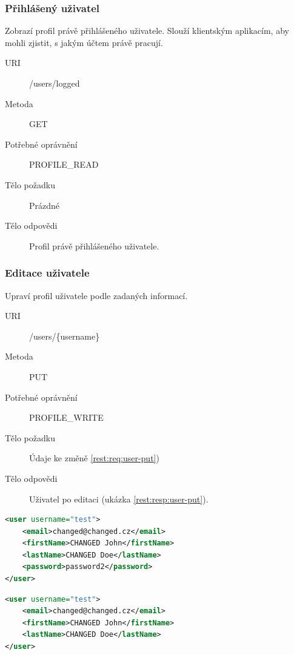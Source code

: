 \documentclass[thesis=M,czech]{FITthesis}[2014/05/6]
\begin{document}
\subsubsection{Přihlášený uživatel}
Zobrazí profil právě přihlášeného uživatele. Slouží klientským aplikacím, aby mohli zjistit, s jakým účtem právě pracují.
\begin{description}
  \item[URI] /users/logged
  \item[Metoda] GET
  \item[Potřebné oprávnění] PROFILE\_READ
  \item[Tělo požadku] Prázdné
  \item[Tělo odpovědi] Profil právě přihlášeného uživatele.
\end{description}

\subsubsection{Editace uživatele}
Upraví profil uživatele podle zadaných informací.
\begin{description}
  \item[URI] /users/\{username\}
  \item[Metoda] PUT
  \item[Potřebné oprávnění] PROFILE\_WRITE
  \item[Tělo požadku] Údaje ke změně \ref{rest:req:user-put})
  \item[Tělo odpovědi] Uživatel po editaci (ukázka \ref{rest:resp:user-put}).
\end{description}

\begin{lstlisting}[caption=Tělo požadavku zdroje /users/\{username\} (PUT), label=rest:req:user-put, language=xml]
<user username="test">
    <email>changed@changed.cz</email>
    <firstName>CHANGED John</firstName>
    <lastName>CHANGED Doe</lastName>
    <password>password2</password>
</user>
\end{lstlisting}  

\begin{lstlisting}[caption=Tělo odpovědi zdroje /users/\{username\} (PUT), label=rest:resp:user-put, language=xml]
<user username="test">   
    <email>changed@changed.cz</email>
    <firstName>CHANGED John</firstName>
    <lastName>CHANGED Doe</lastName>
</user>
\end{lstlisting}
\end{document}
